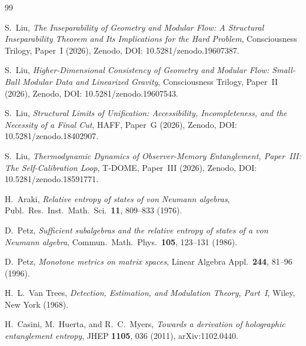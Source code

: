 \documentclass[12pt]{article}
\theoremstyle{definition}
\theoremstyle{remark}
\begin{document}
\begin{thebibliography}{99}

S.~Liu,
\emph{The Inseparability of Geometry and Modular Flow: A Structural Inseparability Theorem and Its Implications for the Hard Problem},
Consciousness Trilogy, Paper~I (2026),
Zenodo, DOI: 10.5281/zenodo.19607387.

S.~Liu,
\emph{Higher-Dimensional Consistency of Geometry and Modular Flow: Small-Ball Modular Data and Linearized Gravity},
Consciousness Trilogy, Paper~II (2026),
Zenodo, DOI: 10.5281/zenodo.19607543.

S.~Liu,
\emph{Structural Limits of Unification: Accessibility, Incompleteness, and the Necessity of a Final Cut},
HAFF, Paper~G (2026),
Zenodo, DOI: 10.5281/zenodo.18402907.

S.~Liu,
\emph{Thermodynamic Dynamics of Observer-Memory Entanglement, Paper~III: The Self-Calibration Loop},
T-DOME, Paper~III (2026),
Zenodo, DOI: 10.5281/zenodo.18591771.

H.~Araki,
\emph{Relative entropy of states of von Neumann algebras},
Publ.\ Res.\ Inst.\ Math.\ Sci.\ \textbf{11}, 809--833 (1976).

D.~Petz,
\emph{Sufficient subalgebras and the relative entropy of states of a von Neumann algebra},
Commun.\ Math.\ Phys.\ \textbf{105}, 123--131 (1986).

D.~Petz,
\emph{Monotone metrics on matrix spaces},
Linear Algebra Appl.\ \textbf{244}, 81--96 (1996).

H.~L.~Van Trees,
\emph{Detection, Estimation, and Modulation Theory, Part~I},
Wiley, New York (1968).

H.~Casini, M.~Huerta, and R.~C.~Myers,
\emph{Towards a derivation of holographic entanglement entropy},
JHEP \textbf{1105}, 036 (2011),
arXiv:1102.0440.

\end{thebibliography}
 
\end{document}
